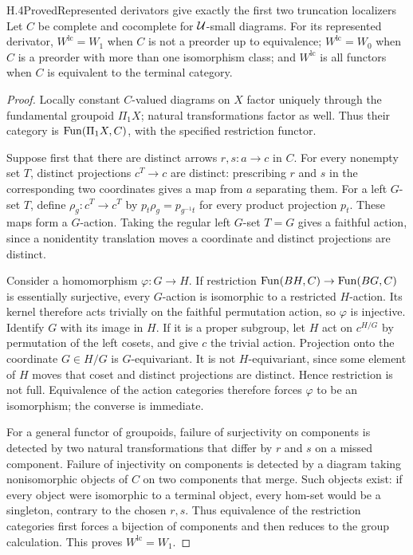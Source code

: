 \begin{claim}{H.4}{Proved}{Represented derivators give exactly the first two truncation localizers}
Let $C$ be complete and cocomplete for $\mathcal U$-small diagrams. For its represented derivator, $W^{\mathrm{lc}}=W_1$ when $C$ is not a preorder up to equivalence; $W^{\mathrm{lc}}=W_0$ when $C$ is a preorder with more than one isomorphism class; and $W^{\mathrm{lc}}$ is all functors when $C$ is equivalent to the terminal category.
\end{claim}
\begin{proof}
Locally constant $C$-valued diagrams on $X$ factor uniquely through the fundamental groupoid $\Pi_1X$; natural transformations factor as well. Thus their category is $\operatorname{Fun}(\Pi_1X,C)$, with the specified restriction functor.

Suppose first that there are distinct arrows $r,s:a\to c$ in $C$. For every nonempty set $T$, distinct projections $c^T\to c$ are distinct: prescribing $r$ and $s$ in the corresponding two coordinates gives a map from $a$ separating them. For a left $G$-set $T$, define $\rho_g:c^T\to c^T$ by $p_t\rho_g=p_{g^{-1}t}$ for every product projection $p_t$. These maps form a $G$-action. Taking the regular left $G$-set $T=G$ gives a faithful action, since a nonidentity translation moves a coordinate and distinct projections are distinct.

Consider a homomorphism $\varphi:G\to H$. If restriction $\operatorname{Fun}(BH,C)\to\operatorname{Fun}(BG,C)$ is essentially surjective, every $G$-action is isomorphic to a restricted $H$-action. Its kernel therefore acts trivially on the faithful permutation action, so $\varphi$ is injective. Identify $G$ with its image in $H$. If it is a proper subgroup, let $H$ act on $c^{H/G}$ by permutation of the left cosets, and give $c$ the trivial action. Projection onto the coordinate $G\in H/G$ is $G$-equivariant. It is not $H$-equivariant, since some element of $H$ moves that coset and distinct projections are distinct. Hence restriction is not full. Equivalence of the action categories therefore forces $\varphi$ to be an isomorphism; the converse is immediate.

For a general functor of groupoids, failure of surjectivity on components is detected by two natural transformations that differ by $r$ and $s$ on a missed component. Failure of injectivity on components is detected by a diagram taking nonisomorphic objects of $C$ on two components that merge. Such objects exist: if every object were isomorphic to a terminal object, every hom-set would be a singleton, contrary to the chosen $r,s$. Thus equivalence of the restriction categories first forces a bijection of components and then reduces to the group calculation. This proves $W^{\mathrm{lc}}=W_1$.


\end{proof}
